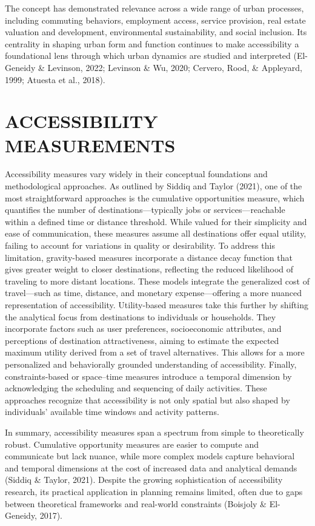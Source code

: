 \documentclass[
  12pt,
]{report}
\begin{document}
The concept has demonstrated relevance across a wide range of urban
processes, including commuting behaviors, employment access, service
provision, real estate valuation and development, environmental
sustainability, and social inclusion. Its centrality in shaping urban
form and function continues to make accessibility a foundational lens
through which urban dynamics are studied and interpreted (El-Geneidy \&
Levinson, 2022; Levinson \& Wu, 2020; Cervero, Rood, \& Appleyard, 1999;
Atuesta et al., 2018).

\section{ACCESSIBILITY MEASUREMENTS}\label{accessibility-measurements}

Accessibility measures vary widely in their conceptual foundations and
methodological approaches. As outlined by Siddiq and Taylor (2021), one
of the most straightforward approaches is the cumulative opportunities
measure, which quantifies the number of destinations---typically jobs or
services---reachable within a defined time or distance threshold. While
valued for their simplicity and ease of communication, these measures
assume all destinations offer equal utility, failing to account for
variations in quality or desirability. To address this limitation,
gravity-based measures incorporate a distance decay function that gives
greater weight to closer destinations, reflecting the reduced likelihood
of traveling to more distant locations. These models integrate the
generalized cost of travel---such as time, distance, and monetary
expense---offering a more nuanced representation of accessibility.
Utility-based measures take this further by shifting the analytical
focus from destinations to individuals or households. They incorporate
factors such as user preferences, socioeconomic attributes, and
perceptions of destination attractiveness, aiming to estimate the
expected maximum utility derived from a set of travel alternatives. This
allows for a more personalized and behaviorally grounded understanding
of accessibility. Finally, constraints-based or space--time measures
introduce a temporal dimension by acknowledging the scheduling and
sequencing of daily activities. These approaches recognize that
accessibility is not only spatial but also shaped by individuals'
available time windows and activity patterns.

In summary, accessibility measures span a spectrum from simple to
theoretically robust. Cumulative opportunity measures are easier to
compute and communicate but lack nuance, while more complex models
capture behavioral and temporal dimensions at the cost of increased data
and analytical demands (Siddiq \& Taylor, 2021). Despite the growing
sophistication of accessibility research, its practical application in
planning remains limited, often due to gaps between theoretical
frameworks and real-world constraints (Boisjoly \& El-Geneidy, 2017).
\end{document}
